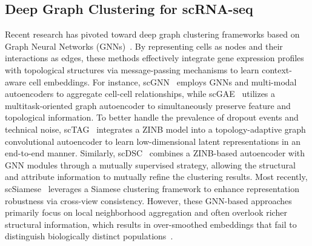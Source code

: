 \subsection{Deep Graph Clustering for scRNA-seq}
Recent research has pivoted toward deep graph clustering frameworks based on Graph Neural Networks (GNNs)~\cite{ju2023glcc,wang2025deep,ren2025mhgc,zhang2026fairgc,ju2026compactness}. By representing cells as nodes and their interactions as edges, these methods effectively integrate gene expression profiles with topological structures via message-passing mechanisms to learn context-aware cell embeddings. For instance, scGNN~\cite{wang2021scgnn} employs GNNs and multi-modal autoencoders to aggregate cell-cell relationships, while scGAE~\cite{luo2021topology} utilizes a multitask-oriented graph autoencoder to simultaneously preserve feature and topological information. To better handle the prevalence of dropout events and technical noise, scTAG~\cite{yu2022zinb} integrates a ZINB model into a topology-adaptive graph convolutional autoencoder to learn low-dimensional latent representations in an end-to-end manner. Similarly, scDSC~\cite{gan2022deep} combines a ZINB-based autoencoder with GNN modules through a mutually supervised strategy, allowing the structural and attribute information to mutually refine the clustering results. Most recently, scSiamese~\cite{xu2025scsiameseclu} leverages a Siamese clustering framework to enhance representation robustness via cross-view consistency. However, these GNN-based approaches primarily focus on local neighborhood aggregation and often overlook richer structural information, which results in over-smoothed embeddings that fail to distinguish biologically distinct populations~\cite{li2018deeper}.

